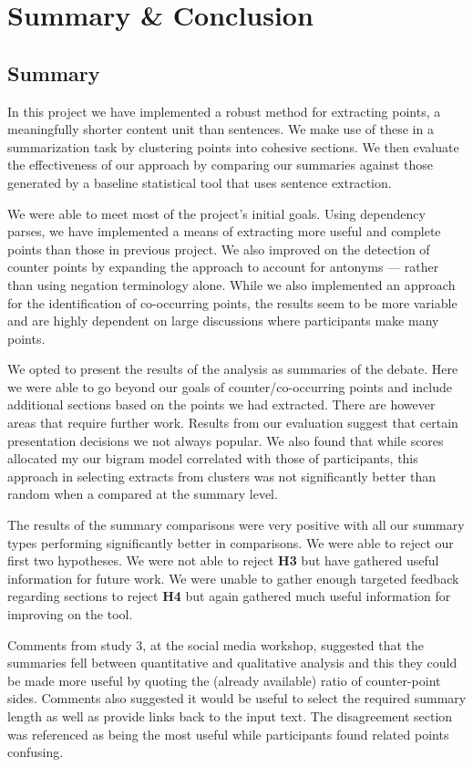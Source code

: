 \chapter{Summary \& Conclusion \label{chap:conclusion}}
  \section{Summary}
    In this project we have implemented a robust method for extracting points, a meaningfully shorter content unit than sentences. We make use of these in a summarization task by clustering points into cohesive sections. We then evaluate the effectiveness of our approach by comparing our summaries against those generated by a baseline statistical tool that uses sentence extraction.

    We were able to meet most of the project's initial goals. Using dependency parses, we have implemented a means of extracting more useful and complete points than those in previous project. We also improved on the detection of counter points by expanding the approach to account for antonyms --- rather than using negation terminology alone. While we also implemented an approach for the identification of co-occurring points, the results seem to be more variable and are highly dependent on large discussions where participants make many points.

    We opted to present the results of the analysis as summaries of the debate. Here we were able to go beyond our goals of counter/co-occurring points and include additional sections based on the points we had extracted. There are however areas that require further work. Results from our evaluation suggest that certain presentation decisions we not always popular. We also found that while scores allocated my our bigram model correlated with those of participants, this approach in selecting extracts from clusters was not significantly better than random when a compared at the summary level.

    The results of the summary comparisons were very positive with all our summary types performing significantly better in comparisons. We were able to reject our first two hypotheses. We were not able to reject \textbf{H3} but have gathered useful information for future work. We were unable to gather enough targeted feedback regarding sections to reject \textbf{H4} but again gathered much useful information for improving on the tool.

    Comments from study 3, at the social media workshop, suggested that the summaries fell between quantitative and qualitative analysis and this they could be made more useful by quoting the (already available) ratio of counter-point sides. Comments also suggested it would be useful to select the required summary length as well as provide links back to the input text. The disagreement section was referenced as being the most useful while participants found related points confusing.

